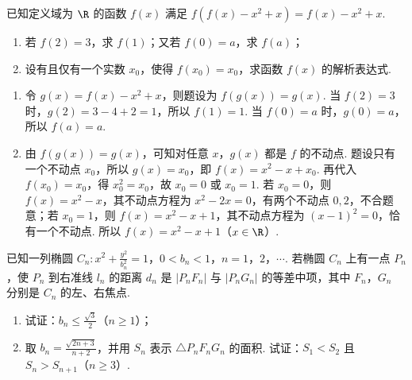 \begin{problem}
已知定义域为 \(\R\) 的函数 \(f(x)\) 满足 \(f(f(x) - x^{2} + x) = f(x) - x^{2} + x\).
\begin{enumerate}
\item 若 \(f(2) = 3\)，求 \(f(1)\)；又若 \(f(0) = a\)，求 \(f(a)\)；
\item 设有且仅有一个实数 \(x_{0}\)，使得 \(f(x_{0}) = x_{0}\)，求函数 \(f(x)\) 的解析表达式.
\end{enumerate}
\end{problem}

\begin{solution}
\begin{enumerate}
\item 令 \(g(x)=f(x)-x^{2}+x\)，则题设为 \(f(g(x))=g(x)\). 当 \(f(2)=3\) 时，\(g(2)=3-4+2=1\)，所以 \(f(1)=1\). 当 \(f(0)=a\) 时，\(g(0)=a\)，所以 \(f(a)=a\).
\item 由 \(f(g(x))=g(x)\)，可知对任意 \(x\)，\(g(x)\) 都是 \(f\) 的不动点. 题设只有一个不动点 \(x_0\)，所以 \(g(x)=x_0\)，即 \(f(x)=x^{2}-x+x_0\). 再代入 \(f(x_0)=x_0\)，得 \(x_0^{2}=x_0\)，故 \(x_0=0\) 或 \(x_0=1\). 若 \(x_0=0\)，则 \(f(x)=x^{2}-x\)，其不动点方程为 \(x^{2}-2x=0\)，有两个不动点 \(0,2\)，不合题意；若 \(x_0=1\)，则 \(f(x)=x^{2}-x+1\)，其不动点方程为 \((x-1)^{2}=0\)，恰有一个不动点. 所以 \(f(x)=x^{2}-x+1\)（\(x\in\R\)）.
\end{enumerate}
\end{solution}

\begin{problem}
已知一列椭圆 \(C_{n}: x^{2} + \frac{y^{2}}{b_{n}^{2}} = 1\)，\(0 < b_{n} < 1\)，\(n=1\)，\(2\)，\(\cdots\). 若椭圆 \(C_{n}\) 上有一点 \(P_{n}\)，使 \(P_{n}\) 到右准线 \(l_{n}\) 的距离 \(d_{n}\) 是 \(|P_{n}F_{n}|\) 与 \(|P_{n}G_{n}|\) 的等差中项，其中 \(F_{n}\)，\(G_{n}\) 分别是 \(C_{n}\) 的左、右焦点.

\begin{enumerate}
\item 试证：\(b_{n} \leqslant \frac{\sqrt{3}}{2}\)（\(n \geqslant 1\)）；
\item 取 \(b_{n} = \frac{\sqrt{2n + 3}}{n + 2}\)，并用 \(S_{n}\) 表示 \(\triangle P_{n}F_{n}G_{n}\) 的面积. 试证：\(S_{1} < S_{2}\) 且 \(S_{n} > S_{n + 1}\)（\(n \geqslant 3\)）.
\end{enumerate}

\end{problem}
\FloatBarrier

